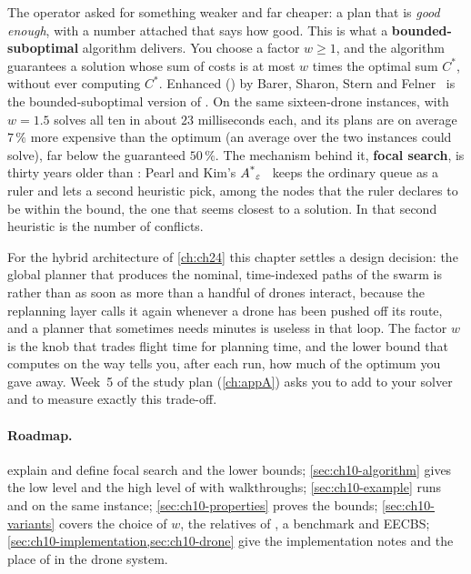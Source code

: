 The operator asked for something weaker and far cheaper: a plan that is
\emph{good enough}, with a number attached that says how good. This is what a
\textbf{bounded-suboptimal} algorithm delivers.
You choose a factor $w \ge 1$, and the algorithm guarantees a solution whose
sum of costs is at most $w$ times the optimal sum $C^*$, without ever computing
$C^*$. Enhanced \cbs (\ecbs) by Barer, Sharon, Stern and
Felner~\cite{barer2014ecbs} is the bounded-suboptimal version of \cbs. On the
same sixteen-drone instances, \ecbs with $w = 1.5$ solves all ten in about
$23$ milliseconds each, and its plans are on average $7\,\%$ more expensive
than the optimum (an average over the two instances \cbs could solve), far
below the guaranteed $50\,\%$. The mechanism behind it,
\textbf{focal search}, is thirty years older than \cbs:
Pearl and Kim's $A\textsuperscript{*}_\varepsilon$~\cite{pearl1982studies} keeps the ordinary
\astar queue as a ruler and lets a second heuristic pick, among the nodes that
the ruler declares to be within the bound, the one that seems closest to a
solution. In \ecbs that second heuristic is the number of conflicts.

For the hybrid architecture of \cref{ch:ch24} this chapter settles a design
decision: the global planner that produces the nominal, time-indexed paths of
the swarm is \ecbs rather than \cbs as soon as more than a handful of drones
interact, because the replanning layer calls it again whenever a drone has
been pushed off its route, and a planner that sometimes needs minutes is
useless in that loop. The factor $w$ is the knob that trades flight time for
planning time, and the lower bound that \ecbs computes on the way tells you,
after each run, how much of the optimum you gave away. Week~5 of the study
plan (\cref{ch:appA}) asks you to add \ecbs to your \cbs solver and to measure
exactly this trade-off.

\paragraph{Roadmap.}  explain and
define focal search and the lower bounds; \cref{sec:ch10-algorithm} gives the
low level and the high level of \ecbs with walkthroughs;
\cref{sec:ch10-example} runs \cbs and \ecbs on the same instance;
\cref{sec:ch10-properties} proves the bounds; \cref{sec:ch10-variants} covers
the choice of $w$, the relatives of \ecbs, a benchmark and EECBS;
\cref{sec:ch10-implementation,sec:ch10-drone} give the implementation notes
and the place of \ecbs in the drone system.


